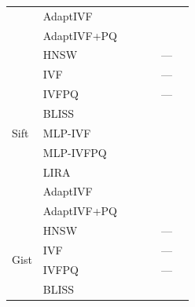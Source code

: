 \begin{table}[t]
\begin{tabular}{llrrrrr}
 & AdaptIVF      & \placeholder{\_\_\_} & \placeholder{\_\_\_} & \placeholder{\_\_\_} & \placeholder{\_\_\_} & \placeholder{\_\_\_} \\
 & AdaptIVF+PQ   & \placeholder{\_\_\_} & \placeholder{\_\_\_} & \placeholder{\_\_\_} & \placeholder{\_\_\_} & \placeholder{\_\_\_} \\
\midrule
\multirow{9}{*}{Sift}
 & HNSW          & \placeholder{\_\_\_} & \placeholder{\_\_\_} & \placeholder{\_\_\_} & ---                  & \placeholder{\_\_\_} \\
 & IVF           & \placeholder{\_\_\_} & \placeholder{\_\_\_} & \placeholder{\_\_\_} & ---                  & \placeholder{\_\_\_} \\
 & IVFPQ         & \placeholder{\_\_\_} & \placeholder{\_\_\_} & \placeholder{\_\_\_} & ---                  & \placeholder{\_\_\_} \\
 & BLISS         & \placeholder{\_\_\_} & \placeholder{\_\_\_} & \placeholder{\_\_\_} & \placeholder{\_\_\_} & \placeholder{\_\_\_} \\
 & MLP-IVF       & \placeholder{\_\_\_} & \placeholder{\_\_\_} & \placeholder{\_\_\_} & \placeholder{\_\_\_} & \placeholder{\_\_\_} \\
 & MLP-IVFPQ     & \placeholder{\_\_\_} & \placeholder{\_\_\_} & \placeholder{\_\_\_} & \placeholder{\_\_\_} & \placeholder{\_\_\_} \\
 & LIRA          & \placeholder{\_\_\_} & \placeholder{\_\_\_} & \placeholder{\_\_\_} & \placeholder{\_\_\_} & \placeholder{\_\_\_} \\
 & AdaptIVF      & \placeholder{\_\_\_} & \placeholder{\_\_\_} & \placeholder{\_\_\_} & \placeholder{\_\_\_} & \placeholder{\_\_\_} \\
 & AdaptIVF+PQ   & \placeholder{\_\_\_} & \placeholder{\_\_\_} & \placeholder{\_\_\_} & \placeholder{\_\_\_} & \placeholder{\_\_\_} \\
\midrule
\multirow{9}{*}{Gist}
 & HNSW          & \placeholder{\_\_\_} & \placeholder{\_\_\_} & \placeholder{\_\_\_} & ---                  & \placeholder{\_\_\_} \\
 & IVF           & \placeholder{\_\_\_} & \placeholder{\_\_\_} & \placeholder{\_\_\_} & ---                  & \placeholder{\_\_\_} \\
 & IVFPQ         & \placeholder{\_\_\_} & \placeholder{\_\_\_} & \placeholder{\_\_\_} & ---                  & \placeholder{\_\_\_} \\
 & BLISS         & \placeholder{\_\_\_} & \placeholder{\_\_\_} & \placeholder{\_\_\_} & \placeholder{\_\_\_} & \placeholder{\_\_\_} \\

\end{tabular}
\end{table}
